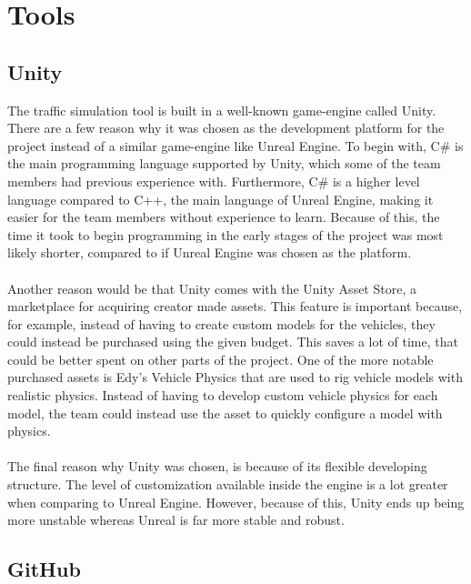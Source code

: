 
\section{Tools}

\subsection{Unity}

The traffic simulation tool is built in a well-known game-engine called Unity. There are a few reason why it was chosen as the development platform for the project instead of a similar game-engine like Unreal Engine. To begin with, C\# is the main programming language supported by Unity, which some of the team members had previous experience with. Furthermore, C\# is a higher level language compared to C++, the main language of Unreal Engine, making it easier for the team members without experience to learn. Because of this, the time it took to begin programming in the early stages of the project was most likely shorter, compared to if Unreal Engine was chosen as the platform.
\\\\
Another reason would be that Unity comes with the Unity Asset Store, a marketplace for acquiring creator made assets. This feature is important because, for example, instead of having to create custom models for the vehicles, they could instead be purchased using the given budget. This saves a lot of time, that could be better spent on other parts of the project. One of the more notable purchased assets is Edy's Vehicle Physics that are used to rig vehicle models with realistic physics. Instead of having to develop custom vehicle physics for each model, the team could instead use the asset to quickly configure a model with physics.
\\\\
The final reason why Unity was chosen, is because of its flexible developing structure. The level of customization available inside the engine is a lot greater when comparing to Unreal Engine. However, because of this, Unity ends up being more unstable whereas Unreal is far more stable and robust. 

\subsection{GitHub}

